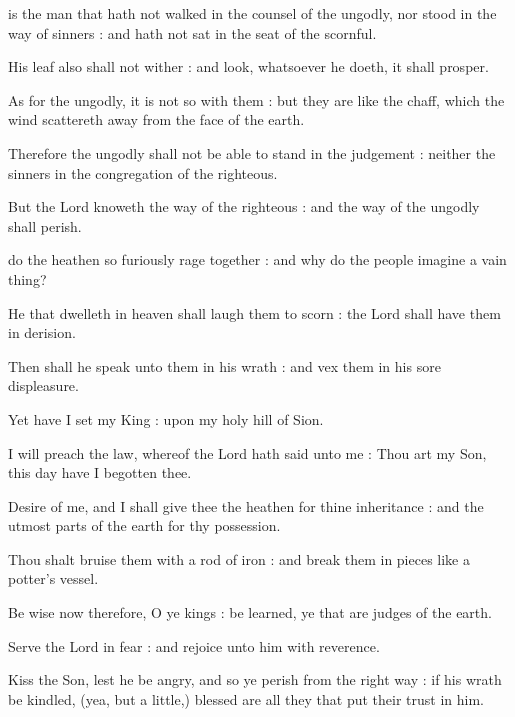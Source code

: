 

 is the man that hath not walked in the counsel of the ungodly, nor stood in the way of sinners : and hath not sat in the seat of the scornful.\par
{}
His leaf also shall not wither : and look, whatsoever he doeth, it shall prosper.\par
{}As for the ungodly, it is not so with them : but they are like the chaff, which the wind scattereth away from the face of the earth.\par
{}Therefore the ungodly shall not be able to stand in the judgement : neither the sinners in the congregation of the righteous.\par
{}But the Lord knoweth the way of the righteous : and the way of the ungodly shall perish.\par


 do the heathen so furiously rage together : and why do the people imagine a vain thing?\par
{}
He that dwelleth in heaven shall laugh them to scorn : the Lord shall have them in derision.\par
{}Then shall he speak unto them in his wrath : and vex them in his sore displeasure.\par
{}Yet have I set my King : upon my holy hill of Sion.\par
{}I will preach the law, whereof the Lord hath said unto me : Thou art my Son, this day have I begotten thee.\par
{}Desire of me, and I shall give thee the heathen for thine inheritance : and the utmost parts of the earth for thy possession.\par
{}Thou shalt bruise them with a rod of iron : and break them in pieces like a potter's vessel.\par
{}Be wise now therefore, O ye kings : be learned, ye that are judges of the earth.\par
{}Serve the Lord in fear : and rejoice unto him with reverence.\par
{}Kiss the Son, lest he be angry, and so ye perish from the right way : if his wrath be kindled, (yea, but a little,) blessed are all they that put their trust in him.\par

